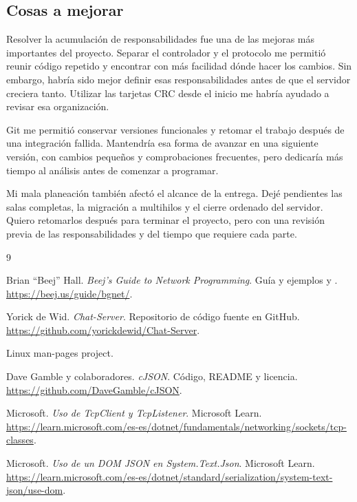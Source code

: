 \documentclass[11pt,letterpaper]{article}
\newcommand{\archivo}[1]{\texttt{\detokenize{#1}}}
\begin{document}
\subsection{Cosas a mejorar}

Resolver la acumulación de responsabilidades fue una de las
mejoras más importantes del proyecto. Separar el controlador
y el protocolo me permitió reunir código repetido y encontrar
con más facilidad dónde hacer los cambios. Sin embargo,
habría sido mejor definir esas responsabilidades antes de
que el servidor creciera tanto. Utilizar las tarjetas CRC
desde el inicio me habría ayudado a revisar esa organización.

Git me permitió conservar versiones funcionales y retomar
el trabajo después de una integración fallida. Mantendría
esa forma de avanzar en una siguiente versión, con cambios
pequeños y comprobaciones frecuentes, pero dedicaría más
tiempo al análisis antes de comenzar a programar.

Mi mala planeación también afectó el alcance de la entrega.
Dejé pendientes las salas completas, la migración a multihilos
y el cierre ordenado del servidor. Quiero retomarlos después
para terminar el proyecto, pero con una revisión previa de
las responsabilidades y del tiempo que requiere cada parte.

\begingroup
\small

\begin{thebibliography}{9}

Brian ``Beej'' Hall.
\textit{Beej's Guide to Network Programming}.
Guía y ejemplos \archivo{selectserver.c} y \archivo{pollserver.c}.
\url{https://beej.us/guide/bgnet/}.

Yorick de Wid.
\textit{Chat-Server}.
Repositorio de código fuente en GitHub.
\url{https://github.com/yorickdewid/Chat-Server}.

Linux man-pages project.

Dave Gamble y colaboradores.
\textit{cJSON}.
Código, README y licencia.
\url{https://github.com/DaveGamble/cJSON}.

Microsoft.
\textit{Uso de TcpClient y TcpListener}.
Microsoft Learn.
\url{https://learn.microsoft.com/es-es/dotnet/fundamentals/networking/sockets/tcp-classes}.

Microsoft.
\textit{Uso de un DOM JSON en System.Text.Json}.
Microsoft Learn.
\url{https://learn.microsoft.com/es-es/dotnet/standard/serialization/system-text-json/use-dom}.

\end{thebibliography}

\endgroup
\end{document}
